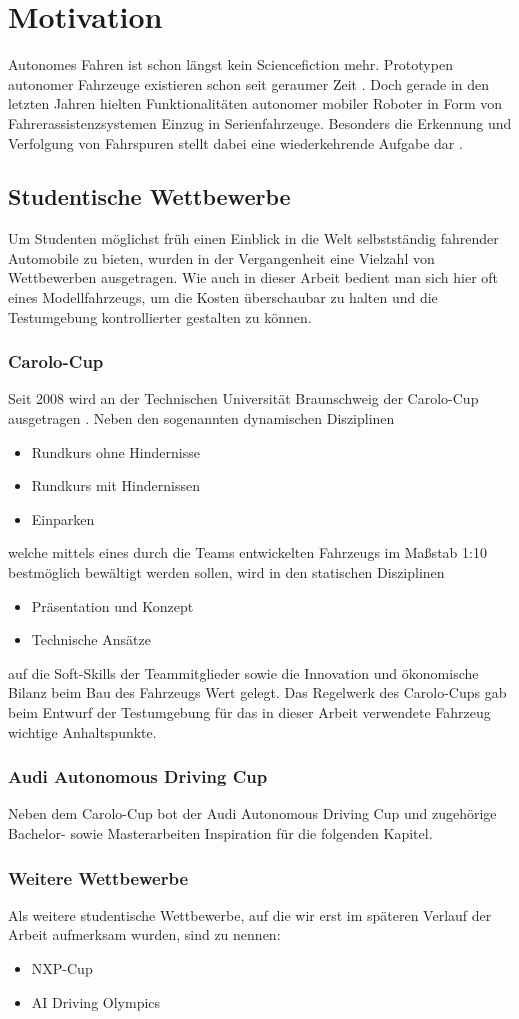 \section{Motivation}
Autonomes Fahren ist schon längst kein Sciencefiction mehr. Prototypen autonomer Fahrzeuge existieren schon seit geraumer Zeit \autocite{AutonomesFahrenSeit}. Doch gerade in den letzten Jahren hielten Funktionalitäten autonomer mobiler Roboter in Form von Fahrerassistenzsystemen Einzug in Serienfahrzeuge. Besonders die Erkennung und Verfolgung von Fahrspuren stellt dabei eine wiederkehrende Aufgabe dar \autocite{kunzeReadingLanesRoad, naroteReviewRecentAdvances2018, guldeSpurhalteassistentenImTest2014}.
\subsection{Studentische Wettbewerbe}
Um Studenten möglichst früh einen Einblick in die Welt selbstständig fahrender Automobile zu bieten, wurden in der Vergangenheit eine Vielzahl von Wettbewerben ausgetragen. Wie auch in dieser Arbeit bedient man sich hier oft eines Modellfahrzeugs, um die Kosten überschaubar zu halten und die Testumgebung kontrollierter gestalten zu können.
\subsubsection{Carolo-Cup}
Seit 2008 wird an der Technischen Universität Braunschweig der Carolo-Cup ausgetragen \autocite{CaroloCupCaroloCup}. Neben den sogenannten dynamischen Disziplinen
\begin{itemize}
\item Rundkurs ohne Hindernisse
\item Rundkurs mit Hindernissen
\item Einparken
\end{itemize}
welche mittels eines durch die Teams entwickelten Fahrzeugs im Maßstab 1:10 bestmöglich bewältigt werden sollen, wird in den statischen Disziplinen
\begin{itemize}
\item Präsentation und Konzept
\item Technische Ansätze
\end{itemize}
auf die Soft-Skills der Teammitglieder sowie die Innovation und ökonomische Bilanz beim Bau des Fahrzeugs Wert gelegt. Das Regelwerk des Carolo-Cups \autocite{CaroloCupRegulations2019} gab beim Entwurf der Testumgebung für das in dieser Arbeit verwendete Fahrzeug wichtige Anhaltspunkte.
\subsubsection{Audi Autonomous Driving Cup}
Neben dem Carolo-Cup bot der Audi Autonomous Driving Cup \cite{AudiAutonomousDriving} und zugehörige Bachelor- sowie Masterarbeiten Inspiration für die folgenden Kapitel.
\subsubsection{Weitere Wettbewerbe}
Als weitere studentische Wettbewerbe, auf die wir erst im späteren Verlauf der Arbeit aufmerksam wurden, sind zu nennen:
\begin{itemize}
\item NXP-Cup \autocite{NXPCupEMEA}
\item AI Driving Olympics \autocite{AIDOAIDriving}
\end{itemize}



